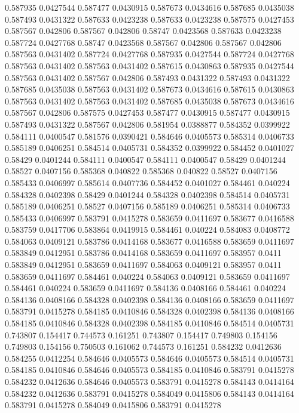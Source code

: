 0.587935 0.0427544
0.587477 0.0430915
0.587673 0.0434616
0.587685 0.0435038
0.587493 0.0431322
0.587633 0.0423238
0.587633 0.0423238
0.587575 0.0427453
0.587567 0.042806
0.587567 0.042806
0.58747 0.0423568
0.587633 0.0423238
0.587724 0.0427768
0.58747 0.0423568
0.587567 0.042806
0.587567 0.042806
0.587563 0.0431402
0.587724 0.0427768
0.587935 0.0427544
0.587724 0.0427768
0.587563 0.0431402
0.587563 0.0431402
0.587615 0.0430863
0.587935 0.0427544
0.587563 0.0431402
0.587567 0.042806
0.587493 0.0431322
0.587493 0.0431322
0.587685 0.0435038
0.587563 0.0431402
0.587673 0.0434616
0.587615 0.0430863
0.587563 0.0431402
0.587563 0.0431402
0.587685 0.0435038
0.587673 0.0434616
0.587567 0.042806
0.587575 0.0427453
0.587477 0.0430915
0.587477 0.0430915
0.587493 0.0431322
0.587567 0.042806
0.581954 0.0388877
0.584352 0.0399922
0.584111 0.0400547
0.581576 0.0390421
0.584646 0.0405573
0.585314 0.0406733
0.585189 0.0406251
0.584514 0.0405731
0.584352 0.0399922
0.584452 0.0401027
0.58429 0.0401244
0.584111 0.0400547
0.584111 0.0400547
0.58429 0.0401244
0.58527 0.0407156
0.585368 0.040822
0.585368 0.040822
0.58527 0.0407156
0.585433 0.0406997
0.585614 0.0407736
0.584452 0.0401027
0.584461 0.040224
0.584328 0.0402398
0.58429 0.0401244
0.584328 0.0402398
0.584514 0.0405731
0.585189 0.0406251
0.58527 0.0407156
0.585189 0.0406251
0.585314 0.0406733
0.585433 0.0406997
0.583791 0.0415278
0.583659 0.0411697
0.583677 0.0416588
0.583759 0.0417706
0.583864 0.0419915
0.584461 0.040224
0.584083 0.0408772
0.584063 0.0409121
0.583786 0.0414168
0.583677 0.0416588
0.583659 0.0411697
0.583849 0.0412951
0.583786 0.0414168
0.583659 0.0411697
0.583957 0.0411
0.583849 0.0412951
0.583659 0.0411697
0.584063 0.0409121
0.583957 0.0411
0.583659 0.0411697
0.584461 0.040224
0.584063 0.0409121
0.583659 0.0411697
0.584461 0.040224
0.583659 0.0411697
0.584136 0.0408166
0.584461 0.040224
0.584136 0.0408166
0.584328 0.0402398
0.584136 0.0408166
0.583659 0.0411697
0.583791 0.0415278
0.584185 0.0410846
0.584328 0.0402398
0.584136 0.0408166
0.584185 0.0410846
0.584328 0.0402398
0.584185 0.0410846
0.584514 0.0405731
0.743807 0.154417
0.744573 0.161251
0.743807 0.154417
0.749803 0.154156
0.749803 0.154156
0.750503 0.161062
0.744573 0.161251
0.584232 0.0412636
0.584255 0.0412254
0.584646 0.0405573
0.584646 0.0405573
0.584514 0.0405731
0.584185 0.0410846
0.584646 0.0405573
0.584185 0.0410846
0.583791 0.0415278
0.584232 0.0412636
0.584646 0.0405573
0.583791 0.0415278
0.584143 0.0414164
0.584232 0.0412636
0.583791 0.0415278
0.584049 0.0415806
0.584143 0.0414164
0.583791 0.0415278
0.584049 0.0415806
0.583791 0.0415278
